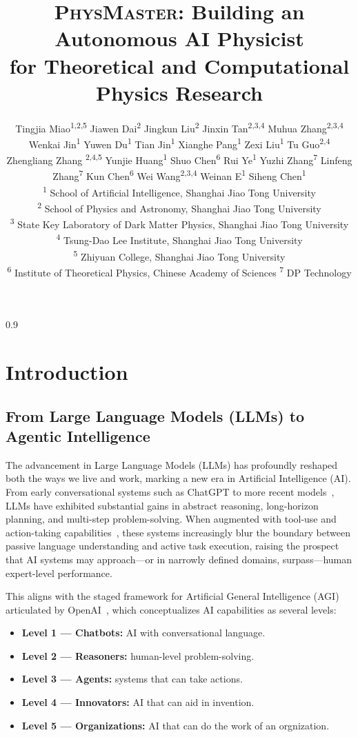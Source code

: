 \documentclass[11pt, a4paper, logo, copyright, nonumbering]{SAI}
\title{\textsc{PhysMaster}: Building an Autonomous AI Physicist \\for Theoretical and Computational Physics Research}
\author{
    Tingjia Miao\textsuperscript{\rm 1,2,5} \quad
    Jiawen Dai\textsuperscript{\rm 2} \quad
    Jingkun Liu\textsuperscript{\rm 2} \quad 
    Jinxin Tan\textsuperscript{\rm 2,3,4} \quad 
    Muhua Zhang\textsuperscript{\rm 2,3,4} \quad
    Wenkai Jin\textsuperscript{\rm 1} \quad     
    Yuwen Du\textsuperscript{\rm 1} \quad 
    Tian Jin\textsuperscript{\rm 1} \quad 
    Xianghe Pang\textsuperscript{\rm 1} \quad 
    Zexi Liu\textsuperscript{\rm 1} \quad 
    Tu Guo\textsuperscript{\rm 2,4}  \quad
    Zhengliang Zhang \textsuperscript{\rm 2,4,5} \quad
    Yunjie Huang\textsuperscript{\rm 1} \quad 
    Shuo Chen\textsuperscript{\rm 6} \quad
    Rui Ye\textsuperscript{\rm 1} \quad 
    Yuzhi Zhang\textsuperscript{\rm 7} \quad
    Linfeng Zhang\textsuperscript{\rm 7} \quad 
    Kun Chen\textsuperscript{\rm 6} \quad \quad \quad
    Wei Wang\textsuperscript{\rm 2,3,4} \quad
    Weinan E\textsuperscript{\rm 1} \quad
    Siheng Chen\textsuperscript{\rm 1}
    \\
    \textsuperscript{\rm 1} School of Artificial Intelligence, Shanghai Jiao Tong University \quad \\
    \textsuperscript{\rm 2} School of Physics and Astronomy, Shanghai Jiao Tong University \quad \\
    \textsuperscript{\rm 3} State Key Laboratory of Dark Matter Physics, Shanghai Jiao Tong University  \quad \\
    \textsuperscript{\rm 4} Tsung-Dao Lee Institute, Shanghai Jiao Tong University\quad \\
    \textsuperscript{\rm 5} Zhiyuan College, Shanghai Jiao Tong University\quad  \\
    \textsuperscript{\rm 6} Institute of Theoretical Physics, Chinese Academy of Sciences \quad \textsuperscript{\rm 7} DP Technology
    }
\begin{document}
\maketitle

\newpage

\begin{spacing}{0.9}
\tableofcontents
\end{spacing}

\newpage

\section{Introduction}
\label{sec:introduction}

\subsection{From Large Language Models (LLMs) to Agentic Intelligence}

The advancement in Large Language Models (LLMs) has profoundly reshaped both the ways we live and work, marking a new era in Artificial Intelligence (AI). From early conversational systems such as ChatGPT to more recent models~\cite{openai2024gpt4,jaech2024openai,guo2025deepseek}, LLMs have exhibited substantial gains in abstract reasoning, long-horizon planning, and multi-step problem-solving. When augmented with tool-use and action-taking capabilities~\cite{schmidgall2025agent}, these systems increasingly blur the boundary between passive language understanding and active task execution, raising the prospect that AI systems may approach---or in narrowly defined domains, surpass---human expert-level performance. 

This aligns with the staged framework for Artificial General Intelligence (AGI) articulated by OpenAI~\cite{openai2024agi}, which conceptualizes AI capabilities as several levels:

\vspace{-2.0ex}
\begin{itemize}
    \item \textbf{Level 1 — Chatbots:} AI with conversational language.
    \item \textbf{Level 2 — Reasoners:} human-level problem-solving.
    \item \textbf{Level 3 — Agents:} systems that can take actions.
    \item \textbf{Level 4 — Innovators:} AI that can aid in invention.
    \item \textbf{Level 5 — Organizations:} AI that can do the work of an orgnization.
\end{itemize}
\vspace{-2.0ex}
\end{document}
